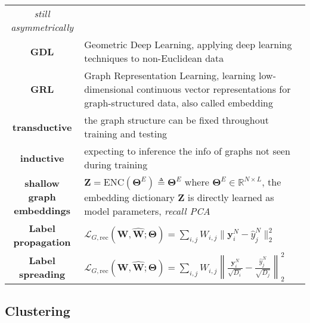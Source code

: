 \begin{table}[htpb]
{\begin{tabular}{cp{32em}}
        \textit{still asymmetrically}\\
        \textbf{GDL} & Geometric Deep Learning, applying deep learning techniques to non-Euclidean data \\
        \textbf{GRL} & Graph Representation Learning, learning low-dimensional continuous vector representations for graph-structured data, also called embedding \\
        \textbf{transductive} & the graph structure can be fixed throughout training and testing \\
        \textbf{inductive} & expecting to inference the info of graphs not seen during training \\
        \textbf{shallow graph embeddings} & $\mathbf{Z}=\mathrm{ENC}(\mathbf{\Theta}^E)\triangleq \mathbf{\Theta}^E$ where $\mathbf{\Theta}^E\in\mathbb{R}^{N\times L}$, the embedding dictionary $\mathbf{Z}$ is directly learned as model parameters, \textit{recall PCA} \\
        \textbf{Label propagation} & $\mathcal{L}_{G,\text{rec}}(\mathbf{W},\hat{\mathbf{W}};\mathbf{\Theta})=\sum_{i,j}W_{i,j}\|\bm{y}_i^N-\hat{y}_j^N\|^2_2$ \\
        \textbf{Label spreading} & $\mathcal{L}_{G,\text{rec}}(\mathbf{W},\hat{\mathbf{W}};\mathbf{\Theta})=\sum_{i,j}W_{i,j}\left\|\frac{\bm{y}_i^N}{\sqrt{D_i}}-\frac{\hat{y}_j^N}{\sqrt{D_j}}\right\|^2_2$ \\
        \bottomrule
    \end{tabular}}
    \label{tab:rest}
\end{table}




\subsection{Clustering}

